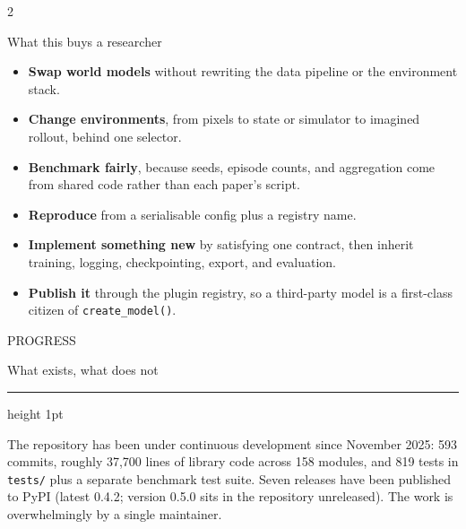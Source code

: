 \documentclass[10pt,a4paper]{article}
\newcommand{\kicker}[1]{{\footnotesize\displayfont\color{accent}\MakeUppercase{#1}}}
\newcommand{\pagetitle}[2]{%
  \kicker{#1}\par\vspace{1.5mm}
  {\Huge\displayfont\color{ink} #2}\par\vspace{2.5mm}
  {\color{rule}\hrule height 1pt}\par\vspace{4mm}}
\newcommand{\subhead}[1]{{\displayfont\color{ink} #1}\par\vspace{1mm}}
\begin{document}
\vspace{2mm}
\begin{multicols}{2}
{\footnotesize
\subhead{What this buys a researcher}
\begin{itemize}
  \item \textbf{Swap world models} without rewriting the data pipeline or the environment stack.
  \item \textbf{Change environments}, from pixels to state or simulator to imagined rollout, behind one selector.
  \item \textbf{Benchmark fairly}, because seeds, episode counts, and aggregation come from shared code rather than each paper's script.
  \item \textbf{Reproduce} from a serialisable config plus a registry name.
  \item \textbf{Implement something new} by satisfying one contract, then inherit training, logging, checkpointing, export, and evaluation.
  \item \textbf{Publish it} through the plugin registry, so a third-party model is a first-class citizen of \texttt{create\_model()}.
\end{itemize}}
\end{multicols}

\newpage
\pagetitle{Progress}{What exists, what does not}

{\footnotesize
The repository has been under continuous development since November 2025: 593 commits, roughly
37{,}700 lines of library code across 158 modules, and 819 tests in \texttt{tests/} plus a separate
benchmark test suite. Seven releases have been published to PyPI (latest 0.4.2; version 0.5.0 sits
in the repository unreleased). The work is overwhelmingly by a single maintainer.}

\vspace{4mm}
\end{document}
